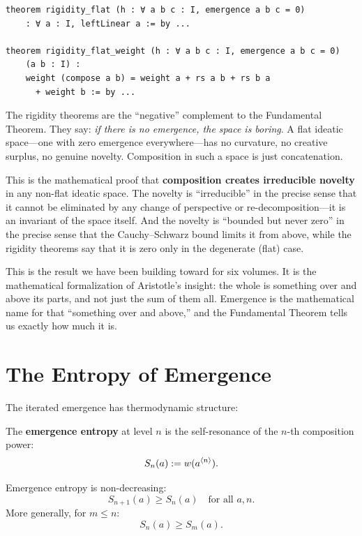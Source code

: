 \begin{lstlisting}[caption={Rigidity theorems (IDT\_v3\_Emergence.lean)}]
theorem rigidity_flat (h : ∀ a b c : I, emergence a b c = 0)
    : ∀ a : I, leftLinear a := by ...

theorem rigidity_flat_weight (h : ∀ a b c : I, emergence a b c = 0)
    (a b : I) :
    weight (compose a b) = weight a + rs a b + rs b a
      + weight b := by ...
\end{lstlisting}

\begin{interpretation}
The rigidity theorems are the ``negative'' complement to the Fundamental Theorem.
They say: \emph{if there is no emergence, the space is boring}. A flat ideatic
space---one with zero emergence everywhere---has no curvature, no creative
surplus, no genuine novelty. Composition in such a space is just concatenation.

This is the mathematical proof that \textbf{composition creates irreducible
novelty} in any non-flat ideatic space. The novelty is ``irreducible'' in the
precise sense that it cannot be eliminated by any change of perspective or
re-decomposition---it is an invariant of the space itself. And the novelty is
``bounded but never zero'' in the precise sense that the Cauchy--Schwarz bound
limits it from above, while the rigidity theorems say that it is zero only in
the degenerate (flat) case.

This is the result we have been building toward for six volumes. It is the
mathematical formalization of Aristotle's insight: the whole is something over
and above its parts, and not just the sum of them all. Emergence is the
mathematical name for that ``something over and above,'' and the Fundamental
Theorem tells us exactly how much it is.
\end{interpretation}


\section{The Entropy of Emergence}
\label{sec:entropy}

The iterated emergence has thermodynamic structure:

\begin{definition}
The \textbf{emergence entropy} at level $n$ is the self-resonance of the
$n$-th composition power:
\[
  S_n(a) := w(a^{\langle n \rangle}).
\]
\end{definition}

\begin{theorem}
\label{thm:second-law}
Emergence entropy is non-decreasing:
\[
  S_{n+1}(a) \geq S_n(a) \quad \text{for all } a, n.
\]
More generally, for $m \leq n$:
\[
  S_n(a) \geq S_m(a).
\]
\end{theorem}

